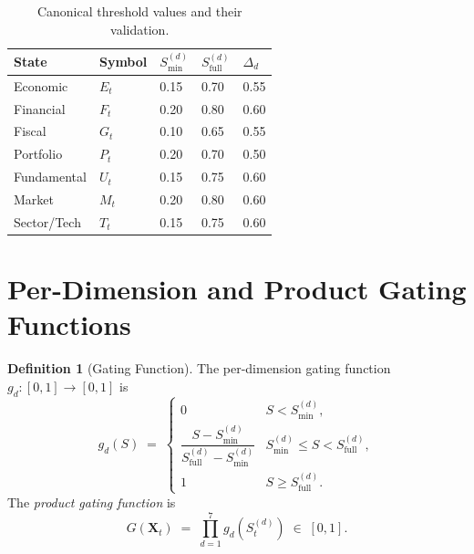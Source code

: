 \documentclass[12pt,openany]{book}
\newcommand{\calE}{\mathcal{E}}
\newcommand{\calF}{\mathcal{F}}
\newcommand{\calG}{\mathcal{G}}
\newcommand{\calP}{\mathcal{P}}
\newcommand{\calU}{\mathcal{U}}
\newcommand{\calM}{\mathcal{M}}
\newcommand{\calT}{\mathcal{T}}
\numberwithin{equation}{chapter}
\theoremstyle{plain}
\theoremstyle{definition}
\newtheorem{definition}[theorem]{Definition}
\theoremstyle{remark}
\def\mathcal#1{#1}%
\begin{document}
\begin{table}[H]
\centering
\caption{Canonical threshold values and their validation.}
\label{tab:thresholds}
\small
\begin{tabularx}{\linewidth}{@{} l l X X X @{}}
\toprule
\textbf{State} & \textbf{Symbol}
  & $\mathcal{S}_{\min}^{(d)}$
  & $\mathcal{S}_{\mathrm{full}}^{(d)}$
  & $\Delta_d$ \\
\midrule
Economic    & $\calE_t$ & 0.15 & 0.70 & 0.55 \\
Financial   & $\calF_t$ & 0.20 & 0.80 & 0.60 \\
Fiscal      & $\calG_t$ & 0.10 & 0.65 & 0.55 \\
Portfolio   & $\calP_t$ & 0.20 & 0.70 & 0.50 \\
Fundamental & $\calU_t$ & 0.15 & 0.75 & 0.60 \\
Market      & $\calM_t$ & 0.20 & 0.80 & 0.60 \\
Sector/Tech & $\calT_t$ & 0.15 & 0.75 & 0.60 \\
\bottomrule
\end{tabularx}
\end{table}

\section{Per-Dimension and Product Gating Functions}

\begin{definition}[Gating Function]
\label{def:gating}
The per-dimension gating function $g_d : [0,1] \to [0,1]$ is
\begin{equation}
  g_d(\mathcal{S}) \;=\;
  \begin{cases}
    0
      & \mathcal{S} < \mathcal{S}_{\min}^{(d)}, \\[2pt]
    \dfrac{\mathcal{S} - \mathcal{S}_{\min}^{(d)}}
          {\mathcal{S}_{\mathrm{full}}^{(d)} - \mathcal{S}_{\min}^{(d)}}
      & \mathcal{S}_{\min}^{(d)} \leq \mathcal{S} <
        \mathcal{S}_{\mathrm{full}}^{(d)}, \\[6pt]
    1
      & \mathcal{S} \geq \mathcal{S}_{\mathrm{full}}^{(d)}.
  \end{cases}
  \label{eq:gating}
\end{equation}
The \emph{product gating function} is
\begin{equation}
  G(\mathbf{X}_t) \;=\; \prod_{d=1}^{7} g_d\!\left(\mathcal{S}_t^{(d)}\right)
  \;\in\; [0,1].
  \label{eq:product-gating}
\end{equation}
\end{definition}
\end{document}
